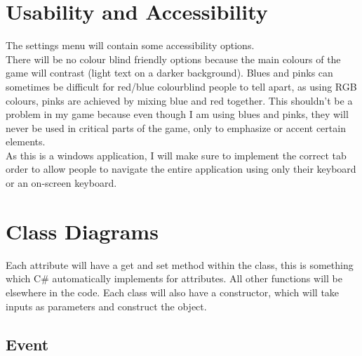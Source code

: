 \section{Usability and Accessibility}
The settings menu will contain some accessibility options.\\
There will be no colour blind friendly options because the main colours of the game will contrast (light text on a darker background). Blues and pinks can sometimes be difficult for red/blue colourblind people to tell apart, as using RGB colours, pinks are achieved by mixing blue and red together. This shouldn’t be a problem in my game because even though I am using blues and pinks, they will never be used in critical parts of the game, only to emphasize or accent certain elements.\\
As this is a windows application, I will make sure to implement the correct tab order to allow people to navigate the entire application using only their keyboard or an on-screen keyboard.

\section{Class Diagrams}
Each attribute will have a get and set method within the class, this is something which C\# automatically implements for attributes. All other functions will be elsewhere in the code. Each class will also have a constructor, which will take inputs as parameters and construct the object.


\begin{figure} [H]
    \centering
    \begin{minipage}{0.45\textwidth}
        
    \end{minipage} \hfill
    \begin{minipage}{0.45\textwidth}
        
    \end{minipage}
\end{figure}

\subsection{Event}

